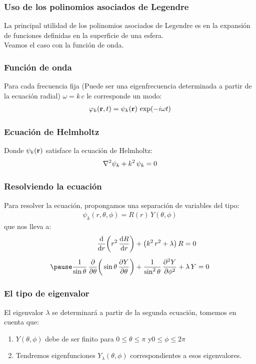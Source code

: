 \documentclass[12pt]{beamer}
\begin{document}
\begin{frame}
\frametitle{Uso de los polinomios asociados de Legendre}
La principal utilidad de los polinomios asociados de Legendre es en la expansión de funciones definidas en la superficie de una esfera.
\\
\bigskip
\pause
Veamos el caso con la función de onda.
\end{frame}
\begin{frame}
\frametitle{Función de onda}
Para cada frecuencia fija \pause (Puede ser una eigenfrecuencia determinada a partir de la ecuación radial) \pause $\omega = k \, c$ le corresponde un modo:
\pause
\begin{align*}
\varphi_{k} (\vb{r}, t) = \psi_{k} (\vb{r}) \, \exp(- i \omega t)
\end{align*}
\end{frame}
\begin{frame}
\frametitle{Ecuación de Helmholtz}
Donde $\psi_{k} (\vb{r})$ satisface la ecuación de Helmholtz:
\pause
\begin{align*}
\laplacian{\psi_{k}} + k^{2} \, \psi_{k} = 0
\end{align*}
\end{frame}
\begin{frame}
\frametitle{Resolviendo la ecuación}
Para resolver la ecuación, propongamos una separación de variables del tipo:
\pause
\begin{align*}
\psi_{k} (r, \theta, \phi) = R (r) \, Y (\theta, \phi)
\end{align*}
\pause
que nos lleva a:
\pause
\begin{eqnarray*}
\begin{aligned}
\dv{r} \bigg( r^{2} \, \dv{R}{r} \bigg) &+ \big( k^{2} \, r^{2} + \lambda \big) \, R = 0 \\[0.5em] \pause
\dfrac{1}{\sin \theta} \, \pdv{\theta} \bigg( \sin \theta \, \pdv{Y}{\theta} \bigg) &+ \dfrac{1}{\sin^{2} \theta} \, \pdv[2]{Y}{\phi} + \lambda \, Y = 0
\end{aligned}
\end{eqnarray*}
\end{frame}
\begin{frame}
\frametitle{El tipo de eigenvalor}
El eigenvalor $\lambda$ se determinará a partir de la segunda ecuación, \pause tomemos en cuenta que:
\pause
{}
\begin{enumerate}[<+->]
\item $Y (\theta, \phi)$ debe de ser finito para $0 \leq \theta \leq \pi$ y$0 \leq \phi \leq 2 \pi$
\item Tendremos eigenfunciones $Y_{\lambda} (\theta, \phi)$ correspondientes a esos eigenvalores.
\end{enumerate}
\end{frame}
\end{document}
